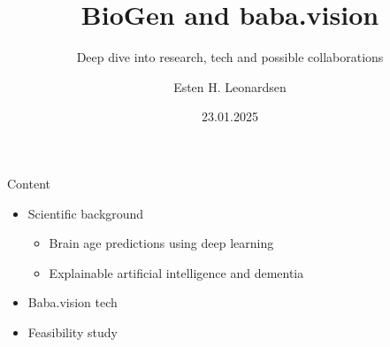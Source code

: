 \documentclass{beamer}
\title{BioGen and baba.vision}
\subtitle{Deep dive into research, tech and possible collaborations}
\date{23.01.2025}
\author{Esten H. Leonardsen}
\begin{document}
    \begin{frame}
        \titlepage
    \end{frame}

    \begin{frame}{Content}
        \begin{itemize}
            \item Scientific background
            \begin{itemize}
                \item Brain age predictions using deep learning
                \item Explainable artificial intelligence and dementia
            \end{itemize}
            \item Baba.vision tech
            \item Feasibility study
        \end{itemize}
    \end{frame}

    
    
\end{document}
